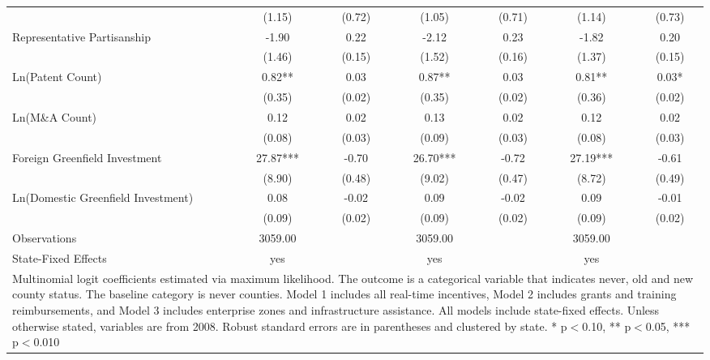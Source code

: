\begin{table}[!htbp]
\begin{tabular}{l*{6}{c}}
                    &      (1.15)   &      (0.72)   &      (1.05)   &      (0.71)   &      (1.14)   &      (0.73)   \\
Representative Partisanship&       -1.90   &        0.22   &       -2.12   &        0.23   &       -1.82   &        0.20   \\
                    &      (1.46)   &      (0.15)   &      (1.52)   &      (0.16)   &      (1.37)   &      (0.15)   \\
Ln(Patent Count)    &        0.82** &        0.03   &        0.87** &        0.03   &        0.81** &        0.03*  \\
                    &      (0.35)   &      (0.02)   &      (0.35)   &      (0.02)   &      (0.36)   &      (0.02)   \\
Ln(M\&A Count)      &        0.12   &        0.02   &        0.13   &        0.02   &        0.12   &        0.02   \\
                    &      (0.08)   &      (0.03)   &      (0.09)   &      (0.03)   &      (0.08)   &      (0.03)   \\
Foreign Greenfield Investment&       27.87***&       -0.70   &       26.70***&       -0.72   &       27.19***&       -0.61   \\
                    &      (8.90)   &      (0.48)   &      (9.02)   &      (0.47)   &      (8.72)   &      (0.49)   \\
Ln(Domestic Greenfield Investment)&        0.08   &       -0.02   &        0.09   &       -0.02   &        0.09   &       -0.01   \\
                    &      (0.09)   &      (0.02)   &      (0.09)   &      (0.02)   &      (0.09)   &      (0.02)   \\
\hline
Observations        &     3059.00   &               &     3059.00   &               &     3059.00   &               \\
State-Fixed Effects &         yes   &               &         yes   &               &         yes   &               \\
\hline\hline
\multicolumn{7}{p{\linewidth}}{\footnotesize Multinomial logit coefficients estimated via maximum likelihood. The outcome is a categorical variable that indicates  never, old and new county status. The baseline category is never counties. Model 1 includes all real-time incentives, Model 2 includes grants and training reimbursements, and Model 3 includes enterprise zones and infrastructure assistance. All models include state-fixed effects. Unless otherwise stated, variables are from 2008. Robust standard errors are in parentheses and clustered by state. * p$<$0.10, ** p$<$0.05, *** p$<$0.010}\\
\end{tabular}
\end{table}
